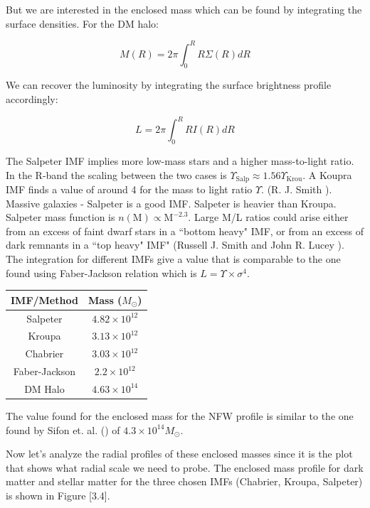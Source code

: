 But we are interested in the enclosed mass which can be found by integrating the surface densities. For the DM halo:

\begin{equation}
M(R)=2\pi \int_{0}^{R} R\Sigma(R)dR
\end{equation}

We can recover the luminosity by integrating the surface brightness profile accordingly:

\begin{equation}
L=2\pi \int_{0}^{R} RI(R)dR
\end{equation}

The Salpeter IMF implies more low-mass stars and a higher mass-to-light ratio. In the R-band the scaling between the two cases is $\Upsilon_{\text{Salp}}\approx 1.56\Upsilon_{\text{Krou}}$. A Koupra IMF finds a value of around 4 for the mass to light ratio $\Upsilon$. (R. J. Smith \citeyear{Reference5}). Massive galaxies - Salpeter is a good IMF. Salpeter is heavier than Kroupa. Salpeter mass function is $n(\textrm{M})\propto \textrm{M}^{-2.3}$. Large M/L ratios could arise either from an excess of faint dwarf stars in a ``bottom heavy" IMF, or from an excess of dark remnants in a ``top heavy" IMF" (Russell J. Smith and John R. Lucey \citeyear{Reference7}). The integration for different IMFs give a value that is comparable to the one found using Faber-Jackson relation which is $L=\Upsilon\times\sigma^{4}$. 

\begin{center}
\begin{tabular}{c c}
IMF/Method & Mass ($M_{\odot}$)\tabularnewline
\hline 
\hline
Salpeter & $4.82\times10^{12}$\tabularnewline
Kroupa & $3.13\times10^{12}$\tabularnewline
Chabrier & $3.03\times10^{12}$\tabularnewline
Faber-Jackson & $2.2\times10^{12}$\tabularnewline
DM Halo & $4.63\times10^{14}$\tabularnewline
\end{tabular}
\end{center}

The value found for the enclosed mass for the NFW profile is similar to the one found by Sifon et. al. (\citeyear{Reference9}) of $4.3\times 10^{14}M_{\odot}$.

Now let's analyze the radial profiles of these enclosed masses since it is the plot that shows what radial scale we need to probe. The enclosed mass profile for dark matter and stellar matter for the three chosen IMFs (Chabrier, Kroupa, Salpeter) is shown in Figure [3.4].

